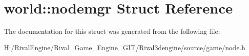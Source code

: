 \hypertarget{structworld_1_1nodemgr}{}\section{world\+:\+:nodemgr Struct Reference}
\label{structworld_1_1nodemgr}


The documentation for this struct was generated from the following file\+:\begin{DoxyCompactItemize}
\item 
H\+:/\+Rival\+Engine/\+Rival\+\_\+\+Game\+\_\+\+Engine\+\_\+\+G\+I\+T/\+Rival3dengine/source/game/node.\+h\end{DoxyCompactItemize}
